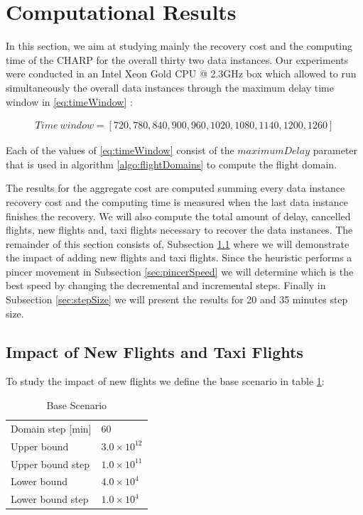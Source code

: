\section{Computational Results}\label{sec:compResults}

In this section, we aim at studying mainly the recovery cost and the computing time of the CHARP for the overall thirty two data instances. Our experiments were conducted in an Intel Xeon Gold CPU @ 2.3GHz box which allowed to run simultaneously the overall data instances through the maximum delay time window in \ref{eq:timeWindow} :

\begin{equation}
	\begin{aligned}
		Time \: window = [720, 780, 840, 900, 960, 1020, 1080, 1140, 1200, 1260]
	\end{aligned}
	\label{eq:timeWindow}
\end{equation} 

Each of the values of \ref{eq:timeWindow} consist of the $maximumDelay$ parameter that is used in algorithm \ref{algo:flightDomains} to compute the flight domain.

The results for the aggregate cost are computed summing every data instance recovery cost and the computing time is measured when the last data instance finishes the recovery. We will also compute the total amount of delay, cancelled flights, new flights and, taxi flights necessary to recover the data instances.
 The remainder of this section consists of, Subsection \ref{sec:impact} where we will demonstrate the impact of adding new flights and taxi flights. Since the heuristic performs a pincer movement in Subsection \ref{sec:pincerSpeed} we will determine which is the best speed by changing the decremental and incremental steps. Finally in Subsection \ref{sec:stepSize} we will present the results for 20 and 35 minutes step size. \\
 
\subsection{Impact of New Flights and Taxi Flights}\label{sec:impact}
To study the impact of new flights we define the base scenario in table \ref{tbl:baseScenario}: 

	\begin{table}[h!]
		\centering
		\caption{Base Scenario}
		\label{tbl:baseScenario}
		\begin{tabular}{ll}
			\hline
			Domain step {[}min{]} & 60                           \\
			Upper bound           & $3.0 \times 10^{12}$ \\
			Upper bound step      & $1.0 \times 10^{11}$ \\
			Lower bound           & $4.0 \times 10^4$ \\
			Lower bound step      & $1.0 \times 10^4$ \\
			\hline
		\end{tabular}
	\end{table}

